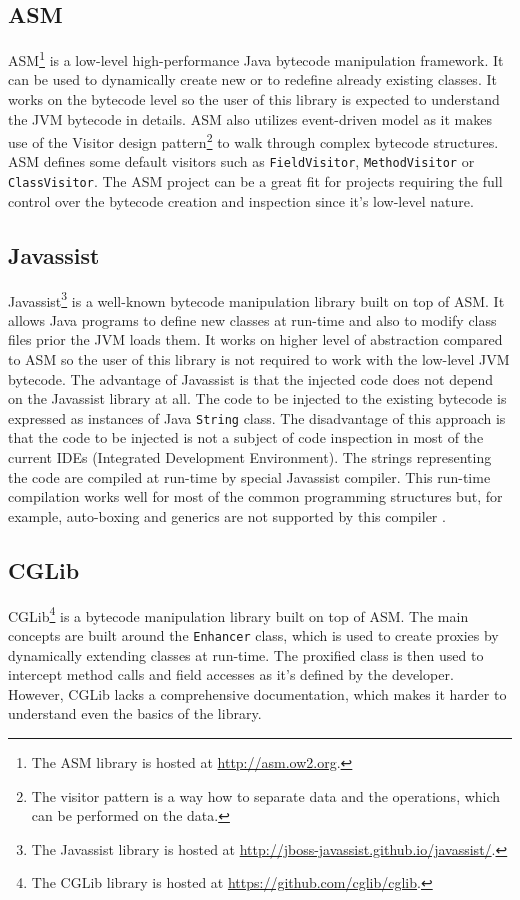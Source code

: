 \subsection{ASM}
\label{asm}
ASM\footnote{The ASM library is hosted at \url{http://asm.ow2.org}.} is a low-level high-performance Java bytecode manipulation framework. It can be used to dynamically create new or to redefine already existing classes. It works on the bytecode level so the user of this library is expected to understand the JVM bytecode in details. ASM also utilizes event-driven model as it makes use of the Visitor design pattern\footnote{The visitor pattern is a way how to separate data and the operations, which can be performed on the data.} to walk through complex bytecode structures. ASM defines some default visitors such as \texttt{FieldVisitor}, \texttt{MethodVisitor} or \texttt{ClassVisitor}. The ASM project can be a great fit for projects requiring the full control over the bytecode creation and inspection since it's low-level nature.
\subsection{Javassist}
\label{javassist}
Javassist\footnote{The Javassist library is hosted at \url{http://jboss-javassist.github.io/javassist/}.} is a well-known bytecode manipulation library built on top of ASM. It allows Java programs to define new classes at run-time and also to modify class files prior the JVM loads them. It works on higher level of abstraction compared to ASM so the user of this library is not required to work with the low-level JVM bytecode. The advantage of Javassist is that the injected code does not depend on the Javassist library at all. The code to be injected to the existing bytecode is expressed as instances of Java \texttt{String} class. The disadvantage of this approach is that the code to be injected is not a subject of code inspection in most of the current IDEs (Integrated Development Environment). The strings representing the code are compiled at run-time by special Javassist compiler. This run-time compilation works well for most of the common programming structures but, for example, auto-boxing and generics are not supported by this compiler \cite{JAVASSIST}.
\subsection{CGLib}
\label{cglib}
CGLib\footnote{The CGLib library is hosted at \url{https://github.com/cglib/cglib}.} is a bytecode manipulation library built on top of ASM. The main concepts are built around the \texttt{Enhancer} class, which is used to create proxies by dynamically extending classes at run-time. The proxified class is then used to intercept method calls and field accesses as it's defined by the developer. However, CGLib lacks a comprehensive documentation, which makes it harder to understand even the basics of the library.

